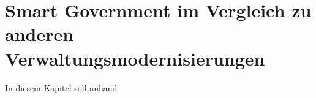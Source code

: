 \section{Smart Government im Vergleich zu anderen Verwaltungsmodernisierungen}
In diesem Kapitel soll anhand 


